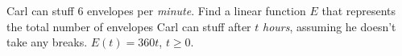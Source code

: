 {Carl can stuff $6$ envelopes per \textit{minute}.  Find a linear function $E$ that represents the total number of envelopes Carl can stuff after $t$ \textit{hours}, assuming he doesn't take any breaks.}
{$E(t) = 360t$, $t \geq 0$.}